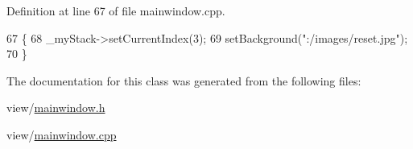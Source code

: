 Definition at line 67 of file mainwindow.\+cpp.


\begin{DoxyCode}
67                            \{
68     \_myStack->setCurrentIndex(3);
69     setBackground(\textcolor{stringliteral}{":/images/reset.jpg"});
70 \}
\end{DoxyCode}


The documentation for this class was generated from the following files\+:\begin{DoxyCompactItemize}
\item 
view/\hyperlink{mainwindow_8h}{mainwindow.\+h}\item 
view/\hyperlink{mainwindow_8cpp}{mainwindow.\+cpp}\end{DoxyCompactItemize}
